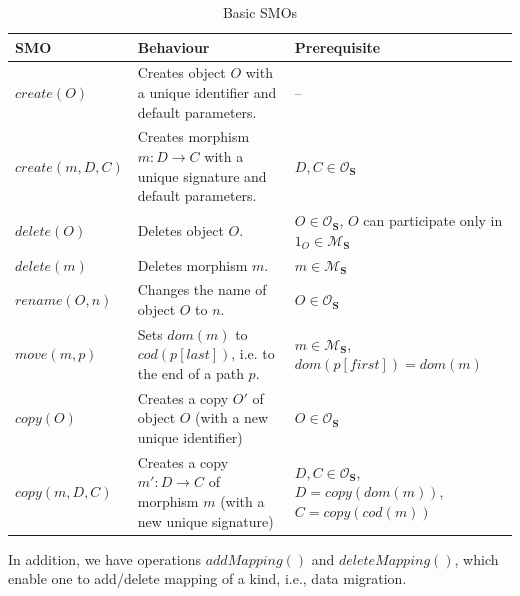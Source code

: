 \begin{scriptsize}
\begin{table}[h]
\caption{Basic SMOs}
\def\arraystretch{1.2}
\begin{tabular}{
    l
    |
    >{\raggedright\arraybackslash}p{30mm}
    >{\raggedright\arraybackslash}p{27mm}
    }
\toprule
\textbf{SMO}  & \textbf{Behaviour}  & \textbf{Prerequisite} \\
\midrule
$\textit{create}(O)$ & Creates object $O$ with a unique identifier and default parameters. & -- \\
$\textit{create}(m, D, C)$ &  Creates morphism $m: D \rightarrow C$ with a unique signature and default parameters. & $D, C \in \mathcal{O}_{\mathbf{S}}$ \\
$\textit{delete}(O)$   & Deletes object $O$.    & $O \in \mathcal{O}_{\mathbf{S}}$, $O$ can participate only in $1_O \in \mathcal{M}_{\mathbf{S}}$  \\
$\textit{delete}(m)$   & Deletes morphism $m$.    & $m \in \mathcal{M}_{\mathbf{S}}$  \\
$\textit{rename}(O, n)$   &  Changes the name of object $O$ to $n$.   & $O \in \mathcal{O}_{\mathbf{S}}$  \\
$\textit{move}(m, p)$   &  Sets $\textit{dom}(m)$ to  $\textit{cod}(p[\textit{last}])$, i.e. to the end of a path $p$.  & $m \in \mathcal{M}_{\mathbf{S}}$, $\textit{dom}(p[\textit{first}]) = \textit{dom}(m)$  \\
$\textit{copy}(O)$   &  Creates a copy $O'$ of object $O$ (with a new unique identifier)  &  $O \in \mathcal{O}_{\mathbf{S}}$ \\
$\textit{copy}(m, D, C)$   &  Creates a copy $m' : D \rightarrow C$ of morphism $m$ (with a new unique signature) & $D,C \in \mathcal{O}_{\mathbf{S}}$, $D = \textit{copy}(\textit{dom}(m))$, $C = \textit{copy}(\textit{cod}(m))$  \\
\bottomrule
\end{tabular}
\end{table}
\end{scriptsize}
In addition, we have operations $\textit{addMapping}()$ and $\textit{deleteMapping}()$, which enable one to add/delete mapping of a kind, i.e., data migration. 

